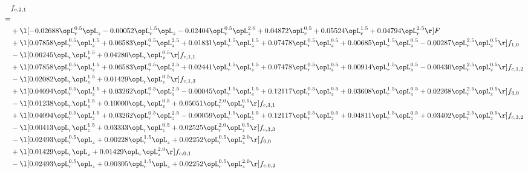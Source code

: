 \begin{alignat}{2} 
\label{eq:f_21_1} 
& f_{c,2,1} \nonumber \\ 
 = \\ 
& + \l[  -0.02688 \opL_r^{0.5} \opL_z   -0.00052 \opL_r^{1.5} \opL_z   -0.02404 \opL_r^{0.5} \opL_z^{2.0} +  0.04872 \opL_r^{0.5} +  0.05524 \opL_r^{1.5} +  0.04794 \opL_r^{2.5}  \r] F \nonumber \\ 
& + \l[  0.07858 \opL_r^{0.5} \opL_z^{1.5} +  0.06583 \opL_r^{0.5} \opL_z^{2.5} +  0.01831 \opL_r^{1.5} \opL_z^{1.5} +  0.07478 \opL_r^{0.5} \opL_z^{0.5} +  0.00685 \opL_r^{1.5} \opL_z^{0.5}   -0.00287 \opL_r^{2.5} \opL_z^{0.5}  \r] f_{1,0} \nonumber \\ 
& - \l[  0.06245 \opL_r \opL_z^{1.5} +  0.04286 \opL_r \opL_z^{0.5}  \r] f_{c,1,1} \nonumber \\ 
& + \l[  0.07858 \opL_r^{0.5} \opL_z^{1.5} +  0.06583 \opL_r^{0.5} \opL_z^{2.5} +  0.02441 \opL_r^{1.5} \opL_z^{1.5} +  0.07478 \opL_r^{0.5} \opL_z^{0.5} +  0.00914 \opL_r^{1.5} \opL_z^{0.5}   -0.00430 \opL_r^{2.5} \opL_z^{0.5}  \r] f_{c,1,2} \nonumber \\ 
& - \l[  0.02082 \opL_r \opL_z^{1.5} +  0.01429 \opL_r \opL_z^{0.5}  \r] f_{c,1,3} \nonumber \\ 
& + \l[  0.04094 \opL_r^{0.5} \opL_z^{1.5} +  0.03262 \opL_r^{0.5} \opL_z^{2.5}   -0.00045 \opL_r^{1.5} \opL_z^{1.5} +  0.12117 \opL_r^{0.5} \opL_z^{0.5} +  0.03608 \opL_r^{1.5} \opL_z^{0.5} +  0.02268 \opL_r^{2.5} \opL_z^{0.5}  \r] f_{3,0} \nonumber \\ 
& - \l[  0.01238 \opL_r \opL_z^{1.5} +  0.10000 \opL_r \opL_z^{0.5} +  0.05051 \opL_r^{2.0} \opL_z^{0.5}  \r] f_{c,3,1} \nonumber \\ 
& + \l[  0.04094 \opL_r^{0.5} \opL_z^{1.5} +  0.03262 \opL_r^{0.5} \opL_z^{2.5}   -0.00059 \opL_r^{1.5} \opL_z^{1.5} +  0.12117 \opL_r^{0.5} \opL_z^{0.5} +  0.04811 \opL_r^{1.5} \opL_z^{0.5} +  0.03402 \opL_r^{2.5} \opL_z^{0.5}  \r] f_{c,3,2} \nonumber \\ 
& - \l[  0.00413 \opL_r \opL_z^{1.5} +  0.03333 \opL_r \opL_z^{0.5} +  0.02525 \opL_r^{2.0} \opL_z^{0.5}  \r] f_{c,3,3} \nonumber \\ 
& - \l[  0.02493 \opL_r^{0.5} \opL_z +  0.00228 \opL_r^{1.5} \opL_z +  0.02252 \opL_r^{0.5} \opL_z^{2.0}  \r] f_{0,0} \nonumber \\ 
& + \l[  0.01429 \opL_r \opL_z +  0.01429 \opL_r \opL_z^{2.0}  \r] f_{c,0,1} \nonumber \\ 
& - \l[  0.02493 \opL_r^{0.5} \opL_z +  0.00305 \opL_r^{1.5} \opL_z +  0.02252 \opL_r^{0.5} \opL_z^{2.0}  \r] f_{c,0,2} \nonumber \\ 

\end{alignat}
